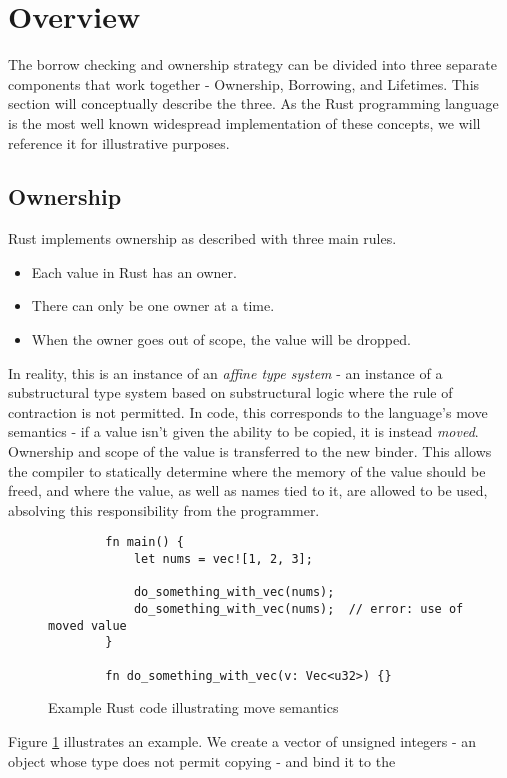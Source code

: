 \documentclass[letterpaper,11pt]{article}
\begin{document}
\section{Overview}
The borrow checking and ownership strategy can be divided into three separate components
that work together - Ownership, Borrowing, and Lifetimes. This section will conceptually
describe the three. As the Rust programming language is the most well known widespread
implementation of these concepts, we will reference it for illustrative purposes.

\subsection{Ownership}
Rust implements ownership as described with three main rules. \cite{rustbook}
\begin{itemize}
    \item Each value in Rust has an owner.
    \item There can only be one owner at a time.
    \item When the owner goes out of scope, the value will be dropped.
\end{itemize}
In reality, this is an instance of an \textit{affine type system} - an instance
of a substructural type system based on substructural logic where the rule
of contraction is not permitted. In code, this corresponds to the language's
move semantics - if a value isn't given the ability to be copied, it is instead
\textit{moved}. Ownership and scope of the value is transferred to the new binder.
This allows the compiler to statically determine where the memory of the value
should be freed, and where the value, as well as names tied to it, are allowed to
be used, absolving this responsibility from the programmer.
\begin{figure}[h]
    \begin{lstlisting}
        fn main() {
            let nums = vec![1, 2, 3];

            do_something_with_vec(nums);
            do_something_with_vec(nums);  // error: use of moved value
        }

        fn do_something_with_vec(v: Vec<u32>) {}
    \end{lstlisting}

    \caption{Example Rust code illustrating move semantics}
    \label{ms}
\end{figure}
Figure \ref{ms} illustrates an example. We create a vector of unsigned
integers - an object whose type does not permit copying - and bind it to the
\end{document}
